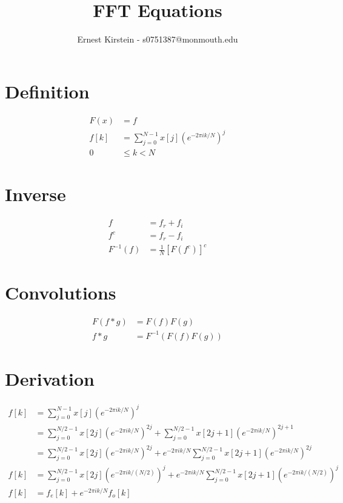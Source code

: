 \documentclass[10pt,a4paper]{article}
\title{FFT Equations}
\author{Ernest Kirstein - s0751387@monmouth.edu}
\begin{document}
\maketitle

\section*{Definition}
\begin{align*}
F(x) &= f\\
f[k] &= \sum_{j=0}^{N-1} x[j]\left(e^{-2\pi i k/N}\right)^j\\
0 &\leq k < N
\end{align*}

\section*{Inverse}
\begin{align*}
f &= f_r+f_i\\
f^c &= f_r-f_i\\
F^{-1}(f) &= \frac{1}{N}[F(f^c)]^c
\end{align*}

\section*{Convolutions}
\begin{align*}
F(f*g) &= F(f)F(g)\\
f*g &= F^{-1}(F(f)F(g))
\end{align*}

\section*{Derivation}
\begin{align*}
f[k] &= \sum_{j=0}^{N-1} x[j]\left(e^{-2\pi i k/N}\right)^j\\
&= \sum_{j=0}^{N/2-1} x[2j]\left(e^{-2\pi i k/N}\right)^{2j}
+\sum_{j=0}^{N/2-1} x[2j+1]\left(e^{-2\pi i k/N}\right)^{2j+1}\\
&= \sum_{j=0}^{N/2-1} x[2j]\left(e^{-2\pi i k/N}\right)^{2j}
+e^{-2\pi i k/N}\sum_{j=0}^{N/2-1} x[2j+1]\left(e^{-2\pi i k/N}\right)^{2j}\\
f[k] &= \sum_{j=0}^{N/2-1} x[2j]\left(e^{-2\pi i k/(N/2)}\right)^{j}
+e^{-2\pi i k/N}\sum_{j=0}^{N/2-1} x[2j+1]\left(e^{-2\pi i k/(N/2)}\right)^{j}\\
f[k] &= f_e[k]+e^{-2\pi i k/N}f_o[k]
\end{align*}
\end{document}
